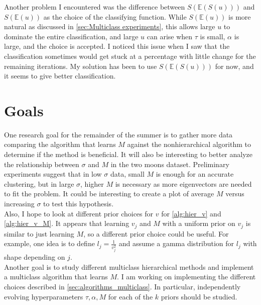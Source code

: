 \documentclass{siamart1116}
\begin{document}
    Another problem I encountered was the difference between $S(\mathbb{E}(S(u)))$ and $S(\mathbb{E}(u))$ as the choice of the classifying function. While $S(\mathbb{E}(u))$ is more natural as discussed in \cref{sec:Multiclass experiments}, this allows large $u$ to dominate the entire classification, and large $u$ can arise when $\tau$ is small, $\alpha$ is large, and the choice is accepted. I noticed this issue when I saw that the classification sometimes would get stuck at a percentage with little change for the remaining iterations. My solution has been to use $S(\mathbb{E}(S(u)))$ for now, and it seems to give better classification.
    
\section{Goals}
    One research goal for the remainder of the summer is to gather more data comparing the algorithm that learns $M$ against the nonhierarchical algorithm to determine if the method is beneficial. It will also be interesting to better analyze the relationship between $\sigma$ and $M$ in the two moons dataset. Preliminary experiments suggest that in low $\sigma$ data, small $M$ is enough for an accurate clustering, but in large $\sigma$, higher $M$ is necessary as more eigenvectors are needed to fit the problem. It could be interesting to create a plot of average $M$ versus increasing $\sigma$ to test this hypothesis. \\
    Also, I hope to look at different prior choices for $v$ for \cref{alg:hier_v} and \cref{alg:hier_v_M}. It appears that learning $v_j$ and $M$ with a uniform prior on $v_j$ is similar to just learning $M$, so a different prior choice could be useful. For example, one idea is to define $l_j = \frac{1}{v_j^2}$ and assume a gamma distribution for $l_j$ with shape depending on $j$. \\
    Another goal is to study different multiclass hierarchical methods and implement a multiclass algorithm that learns $M$. I am working on implementing the different choices described in \cref{sec:algorithms_multiclass}. In particular, independently evolving hyperparameters $\tau, \alpha, M$ for each of the $k$ priors should be studied.



\end{document}

